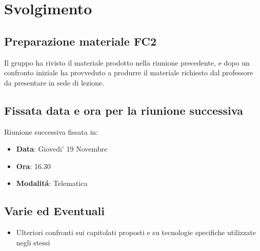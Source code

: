 \documentclass[]{article}
\begin{document}
	\section{Svolgimento}
	\subsection{Preparazione materiale FC2}
	Il gruppo ha rivisto il materiale prodotto nella riunione precedente, e dopo un confronto iniziale ha provveduto a produrre il materiale richiesto dal professore da presentare in sede di lezione. 
	\subsection{Fissata data e ora per la riunione successiva}
	Riunione successiva fissata in:
	\begin{itemize}
		\item \textbf{Data}: Giovedi' 19 Novembre
		\item \textbf{Ora}: 16.30
		\item \textbf{Modalitá}: Telematica
	\end{itemize}
	
	\subsection{Varie ed Eventuali}
	\begin{itemize}
		\item Ulteriori confronti sui capitolati proposti e su tecnologie specifiche utilizzate negli stessi
	\end{itemize}
  
\end{document}
